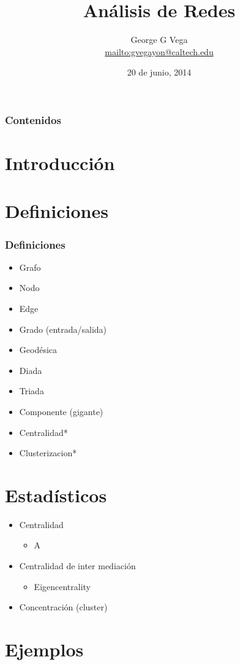 \documentclass{beamer}
\author{George G Vega\\ \url{mailto:gvegayon@caltech.edu}}
\title{An\'alisis de Redes}
\date{20 de junio, 2014}
\begin{document}
\frame{\maketitle}

\begin{frame}
\frametitle{Contenidos}
\tableofcontents
\end{frame}

\section{Introducci\'on}

\section{Definiciones}

\begin{frame}
\frametitle{Definiciones}

\begin{itemize}
\item Grafo
\item Nodo
\item Edge
\item Grado (entrada/salida)
\item Geod\'esica
\item Diada
\item Triada
\item Componente (gigante)
\item Centralidad*
\item Clusterizacion*
\end{itemize}
\end{frame}

\section{Estad\'isticos}

\begin{frame}
\begin{itemize}
\item Centralidad
  \begin{itemize}
  \item A
  \end{itemize}
\item Centralidad de inter mediaci\'on
  \begin{itemize}
  \item Eigencentrality
  \end{itemize}
\item Concentraci\'on (cluster)
\end{itemize}
\end{frame}


\begin{frame}

\end{frame}

\section{Ejemplos}
\end{document}
